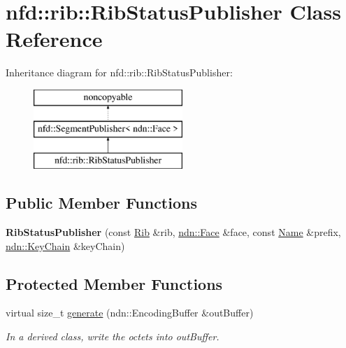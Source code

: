 \hypertarget{classnfd_1_1rib_1_1RibStatusPublisher}{}\section{nfd\+:\+:rib\+:\+:Rib\+Status\+Publisher Class Reference}
\label{classnfd_1_1rib_1_1RibStatusPublisher}
Inheritance diagram for nfd\+:\+:rib\+:\+:Rib\+Status\+Publisher\+:\begin{figure}[H]
\begin{center}
\leavevmode
\includegraphics[height=3.000000cm]{classnfd_1_1rib_1_1RibStatusPublisher}
\end{center}
\end{figure}
\subsection*{Public Member Functions}
\begin{DoxyCompactItemize}
\item 
{\bfseries Rib\+Status\+Publisher} (const \hyperlink{classnfd_1_1rib_1_1Rib}{Rib} \&rib, \hyperlink{classndn_1_1Face}{ndn\+::\+Face} \&face, const \hyperlink{classndn_1_1Name}{Name} \&prefix, \hyperlink{classndn_1_1security_1_1KeyChain}{ndn\+::\+Key\+Chain} \&key\+Chain)\hypertarget{classnfd_1_1rib_1_1RibStatusPublisher_aaebf0c21c87344032f485e66b2dda007}{}\label{classnfd_1_1rib_1_1RibStatusPublisher_aaebf0c21c87344032f485e66b2dda007}

\end{DoxyCompactItemize}
\subsection*{Protected Member Functions}
\begin{DoxyCompactItemize}
\item 
virtual size\+\_\+t \hyperlink{classnfd_1_1rib_1_1RibStatusPublisher_ac62ffc6e9b37fe6fbb823e6c45caa154}{generate} (ndn\+::\+Encoding\+Buffer \&out\+Buffer)\hypertarget{classnfd_1_1rib_1_1RibStatusPublisher_ac62ffc6e9b37fe6fbb823e6c45caa154}{}\label{classnfd_1_1rib_1_1RibStatusPublisher_ac62ffc6e9b37fe6fbb823e6c45caa154}

\begin{DoxyCompactList}\small\item\em In a derived class, write the octets into out\+Buffer. \end{DoxyCompactList}\end{DoxyCompactItemize}
